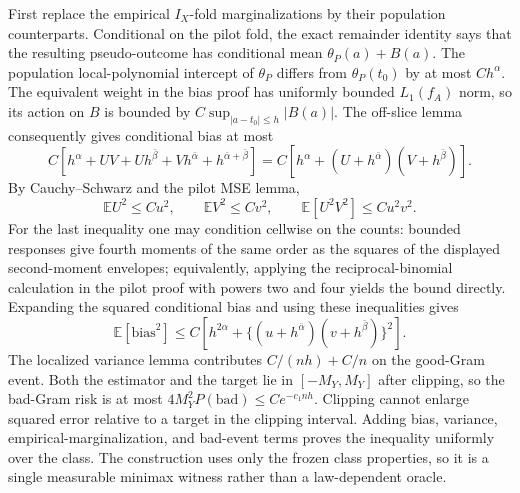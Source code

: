 First replace the empirical \(I_X\)-fold marginalizations by their population counterparts. Conditional on the pilot fold, the exact remainder identity says that the resulting pseudo-outcome has conditional mean \(\theta_P(a)+B(a)\). The population local-polynomial intercept of \(\theta_P\) differs from \(\theta_P(t_0)\) by at most \(Ch^\alpha\). The equivalent weight in the bias proof has uniformly bounded \(L_1(f_A)\) norm, so its action on \(B\) is bounded by \(C\sup_{\lvert a-t_0\rvert\le h}\lvert B(a)\rvert\). The off-slice lemma consequently gives conditional bias at most
\[
C\left[h^\alpha+UV+Uh^{\bar\beta}+Vh^{\bar\alpha}+h^{\bar\alpha+\bar\beta}\right]
=C\left[h^\alpha+(U+h^{\bar\alpha})(V+h^{\bar\beta})\right].
\]
By Cauchy--Schwarz and the pilot MSE lemma,
\[
\mathbb E U^2\le Cu^2,
\qquad
\mathbb E V^2\le Cv^2,
\qquad
\mathbb E[U^2V^2]\le C u^2v^2.
\]
For the last inequality one may condition cellwise on the counts: bounded responses give fourth moments of the same order as the squares of the displayed second-moment envelopes; equivalently, applying the reciprocal-binomial calculation in the pilot proof with powers two and four yields the bound directly. Expanding the squared conditional bias and using these inequalities gives
\[
\mathbb E[\mathrm{bias}^2]
\le C\left[h^{2\alpha}+\{(u+h^{\bar\alpha})(v+h^{\bar\beta})\}^2\right].
\]
The localized variance lemma contributes \(C/(nh)+C/n\) on the good-Gram event. Both the estimator and the target lie in \([-M_Y,M_Y]\) after clipping, so the bad-Gram risk is at most \(4M_Y^2P(\mathrm{bad})\le Ce^{-c_1nh}\). Clipping cannot enlarge squared error relative to a target in the clipping interval. Adding bias, variance, empirical-marginalization, and bad-event terms proves the inequality uniformly over the class. The construction uses only the frozen class properties, so it is a single measurable minimax witness rather than a law-dependent oracle.